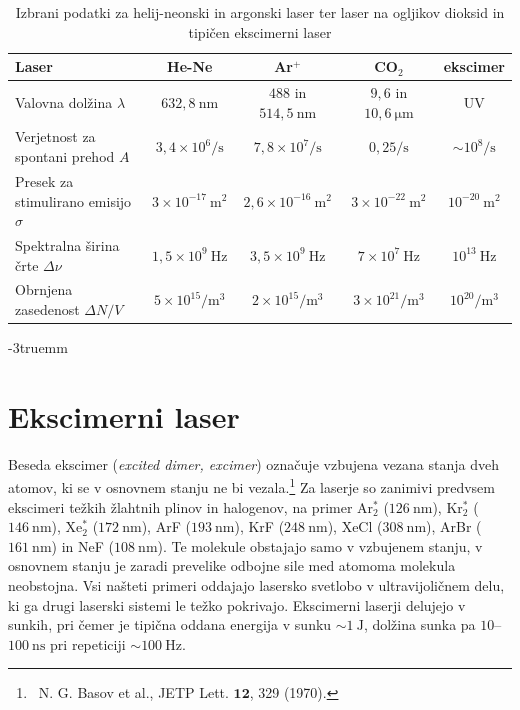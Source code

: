 \begin{table}
\small
\begin{center}
\begin{tabular}{|l|c|c|c|c|}\hline
Laser & He-Ne & Ar$^+$ & CO$_2$ & ekscimer\\ \hline
Valovna dolžina  $\lambda$ & $632,8~\si{\nano\metre}$& $488$ in
$514,5~\si{\nano\metre}$ & $9,6$ in $10,6~\si{\micro\metre}$ & UV
\\ \hline
Verjetnost za spontani prehod $A$ & $3,4 \times 10^6/\si{\second}$ & 
$7,8 \times 10^7/\si{\second}$ & $0,25/\si{\second}$ & $\sim 10^8/\si{\second}$ \\ \hline
Presek za stimulirano emisijo $\sigma$ & $3 \times 10^{-17}~\si{\metre}^2$&  $2,6 \times 10^{-16}~\si{\metre}^2$ & $3 \times 10^{-22}~\si{\metre}^2$ & $ 10^{-20}~\si{\metre}^2$ \\ \hline
Spektralna širina črte $\Delta \nu$ & $1,5 \times 10^{9}~\si{\hertz}$ & 
$3,5 \times 10^{9}~\si{\hertz}$ &$7 \times 10^{7}~\si{\hertz}$ & $10^{13}~\si{\hertz}$ \\ \hline
Obrnjena zasedenost $\Delta N/V$ & $5 \times 10^{15}/\si{\metre}^3$ & $2 \times 10^{15}/\si{\metre}^3$ & $3 \times 10^{21}/\si{\metre}^3$ & $10^{20}/\si{\metre}^3$\\ \hline
\end{tabular}
\caption{Izbrani podatki za helij-neonski in argonski laser ter laser na ogljikov dioksid in tipičen ekscimerni laser}
\label{tab:Ar}
\end{center}\vglue-3truemm
\end{table}

\section{Ekscimerni laser}
Beseda ekscimer ({\it excited dimer, excimer}) označuje vzbujena vezana 
stanja dveh atomov, 
ki se v osnovnem stanju ne bi vezala.\footnote{~N. G. Basov et al., JETP Lett.
$\mathbf{12}$, 329 (1970).}
Za laserje so zanimivi predvsem ekscimeri
težkih žlahtnih plinov in halogenov, na primer Ar$_2^*$ ($126~\si{\nano\metre}$), 
Kr$_2^*$ ($146~\si{\nano\metre}$), Xe$_2^*$ ($172~\si{\nano\metre}$),
ArF ($193~\si{\nano\metre}$), KrF ($248~\si{\nano\metre}$), 
XeCl ($308~\si{\nano\metre}$), ArBr ($161~\si{\nano\metre}$) in 
NeF ($108~\si{\nano\metre}$). Te molekule obstajajo samo v vzbujenem stanju,
v osnovnem stanju  je zaradi prevelike odbojne sile med atomoma molekula neobstojna.
Vsi našteti primeri oddajajo lasersko svetlobo v
ultravijoličnem delu, ki ga drugi laserski sistemi le težko pokrivajo. 
Ekscimerni laserji delujejo v sunkih, pri čemer je tipična oddana energija v sunku 
$\sim 1~\si{\joule}$, dolžina sunka pa $10$--$100~\si{\nano\second}$ pri repeticiji
$\sim 100~\si{\hertz}$.

